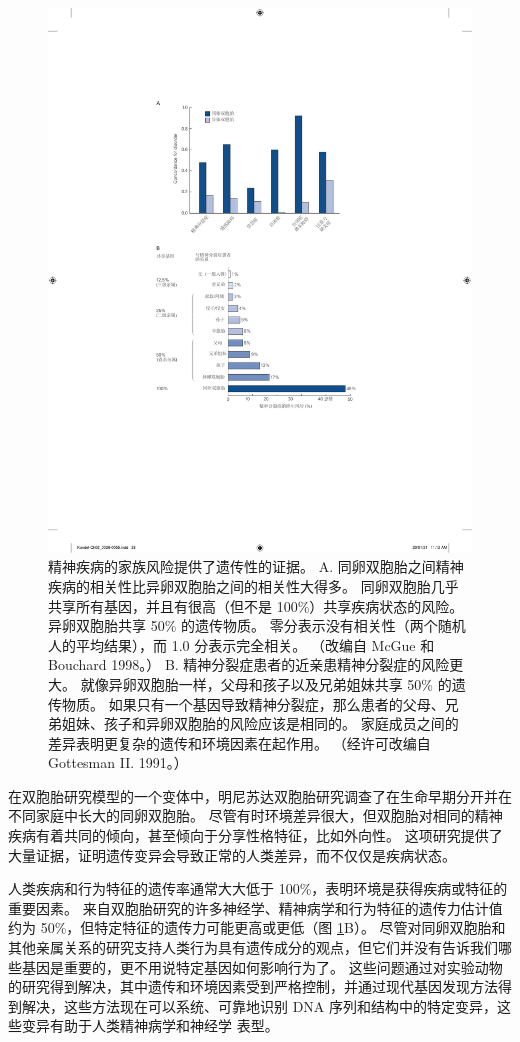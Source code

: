 \begin{figure}[htbp]
	\centering
	\includegraphics[width=0.5\linewidth]{chap02/fig_2_1}
	\caption{精神疾病的家族风险提供了遗传性的证据。 
		A. 同卵双胞胎之间精神疾病的相关性比异卵双胞胎之间的相关性大得多。 
		同卵双胞胎几乎共享所有基因，并且有很高（但不是 100\%）共享疾病状态的风险。 
		异卵双胞胎共享 50\% 的遗传物质。 
		零分表示没有相关性（两个随机人的平均结果），而 1.0 分表示完全相关。 
		（改编自 McGue 和 Bouchard 1998。） 
		B. 精神分裂症患者的近亲患精神分裂症的风险更大。 
		就像异卵双胞胎一样，父母和孩子以及兄弟姐妹共享 50\% 的遗传物质。 
		如果只有一个基因导致精神分裂症，那么患者的父母、兄弟姐妹、孩子和异卵双胞胎的风险应该是相同的。 
		家庭成员之间的差异表明更复杂的遗传和环境因素在起作用。 
		（经许可改编自 Gottesman II. 1991。）}
	\label{fig:2_1}
\end{figure}


在双胞胎研究模型的一个变体中，明尼苏达双胞胎研究调查了在生命早期分开并在不同家庭中长大的同卵双胞胎。
尽管有时环境差异很大，但双胞胎对相同的精神疾病有着共同的倾向，甚至倾向于分享性格特征，比如外向性。 
这项研究提供了大量证据，证明遗传变异会导致正常的人类差异，而不仅仅是疾病状态。

人类疾病和行为特征的遗传率通常大大低于 100\%，表明环境是获得疾病或特征的重要因素。 
来自双胞胎研究的许多神经学、精神病学和行为特征的遗传力估计值约为 50\%，但特定特征的遗传力可能更高或更低（图 \ref{fig:2_1}B）。 
尽管对同卵双胞胎和其他亲属关系的研究支持人类行为具有遗传成分的观点，但它们并没有告诉我们哪些基因是重要的，更不用说特定基因如何影响行为了。 
这些问题通过对实验动物的研究得到解决，其中遗传和环境因素受到严格控制，并通过现代基因发现方法得到解决，这些方法现在可以系统、可靠地识别 DNA 序列和结构中的特定变异，这些变异有助于人类精神病学和神经学 表型。


